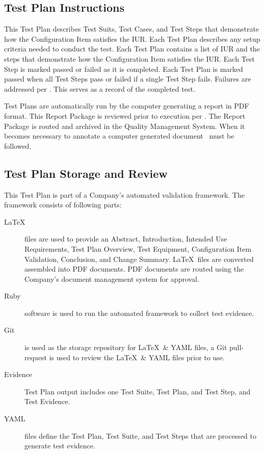 \subsection{Test Plan Instructions}
This Test Plan describes Test Suits, Test Cases, and Test Steps that demonstrate
how the Configuration Item satisfies the IUR.  Each Test Plan describes any
setup criteria needed to conduct the test.  Each Test Plan contains a list of
IUR and the steps that demonstrate how the Configuration Item satisfies the IUR.
Each Test Step is marked passed or failed as it is completed.  Each Test Plan is
marked passed when all Test Steps pass or failed if a single Test Step fails.
Failures are addressed per \sopISS. This serves as a record of the completed
test.

Test Plans are automatically run by the computer generating a report in PDF
format.  This Report Package is reviewed prior to execution per \sopSDLC.  The
Report Package is routed and archived in the Quality Management System.  When it
becomes necessary to annotate a computer generated document \sopGDP\ must be
followed.

\subsection{Test Plan Storage and Review}
This Test Plan is part of a Company's automated validation framework.  The
framework consists of following parts:
\begin{description}
  \item[\LaTeX] files are used to provide an Abstract, Introduction, Intended
    Use Requirements, Test Plan Overview, Test Equipment, Configuration
    Item Validation, Conclusion, and Change Summary.  \LaTeX\ files are converted
    assembled into PDF documents.  PDF documents are routed using the Company's
    document management system for approval.

  \item[Ruby] software is used to run the automated framework to collect test
    evidence.

  \item[Git] is used as the storage repository for \LaTeX\ \& YAML files, a Git
    pull-request is used to review the \LaTeX\ \& YAML files prior to use.

  \item[Evidence] Test Plan output includes one Test Suite, Test Plan, and Test
    Step, and Test Evidence.

  \item[YAML] files define the Test Plan, Test Suite, and Test Steps that are
    processed to generate test evidence.
\end{description}
